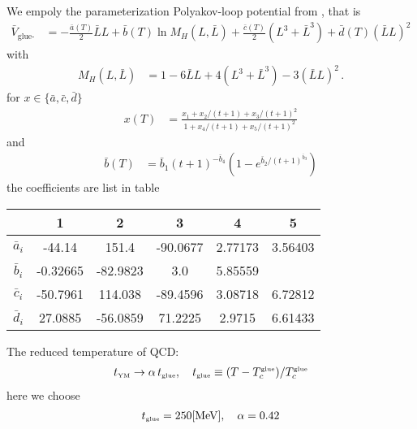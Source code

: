\documentclass[12pt]{article}
\begin{document}
We empoly the parameterization Polyakov-loop potential from \cite{Lo:2013hla}, that is
\begin{align}
  \bar V_{\text{glue-Haar}} &= -\frac{\bar a(T)}{2} \bar L L + \bar b(T)\ln M_H(L,\bar{L})+ \frac{\bar c(T)}{2} (L^3+\bar L^3) + \bar d(T) (\bar{L} L)^2
\end{align}
with
\begin{align}
M_H (L, \bar{L})&= 1 -6 \bar{L}L + 4 (L^3+\bar{L}^3) - 3  (\bar{L}L)^2\,.
\end{align}
for $x\in \{\bar a, \bar c, \bar d\}$
\begin{align}
  x(T) &= \frac{x_1 + x_2/(t+1) + x_3/(t+1)^2}{1 + x_4/(t+1) + x_5/(t+1)^2}
\end{align}
and
\begin{align}
  \bar b(T) &=\bar b_1 (t+1)^{-\bar b_4}(1 -e^{\bar b_2/(t+1)^{\bar b_3}} )
\end{align}
the coefficients are list in table
\begin{table}
  \centering
  \begin{tabular}{cccccc}
    \hline\hline
    & 1 & 2 & 3 & 4 & 5 \rule{0pt}{2.6ex}\rule[-1.2ex]{0pt}{0pt}
    \\ \hline
    $\bar a_i$ &-44.14& 151.4 & -90.0677 &2.77173 &3.56403 \\
    $\bar b_i$ &-0.32665 &-82.9823 &3.0 &5.85559  &\\
    $\bar c_i$ &-50.7961 &114.038 &-89.4596 &3.08718 &6.72812\\
    $\bar d_i$ &27.0885 &-56.0859 &71.2225 &2.9715 &6.61433\\\hline\hline
  \end{tabular}
\end{table}

The reduced temperature of QCD:
\begin{align}
  t_{\text{\tiny{YM}}}\rightarrow \alpha\,t_{\text{\tiny{glue}}},\quad 
  t_{\text{\tiny{glue}}}\equiv(T-T_c^\text{\tiny{glue}})/T_c^\text{\tiny{glue}}
\end{align}
here we choose
\begin{align}
t_{\text{\tiny{glue}}}=250 \text{[MeV]},\quad 
\alpha=0.42
\end{align}
\end{document}

